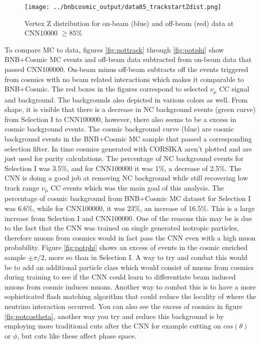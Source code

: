 \begin{figure}[htp!]
\centering
\texttt{[image: ../bnbcosmic\_output/data85\_trackstartZdist.png]}
\caption{Vertex Z distribution for on-beam (blue) and off-beam (red) data at CNN10000 $\geq 85\%$} 
\label{fig:dataZ}
\end{figure}

To compare MC to data, figures \ref{fig:pottrack} through \ref{fig:potphi} show BNB+Cosmic MC events and off-beam data subtracted from on-beam data that passed CNN100000. On-beam minus off-beam subtracts off the events triggered from cosmics with no beam related interactions which makes it comparable to BNB+Cosmic. The red boxes in the figures correspond to selected $\nu_{\mu}$ CC signal and background. The backgrounds also depicted in various colors as well. From shape, it is visible that there is a decrease in NC background events (green curve) from Selection I to CNN100000, however, there also seems to be a excess in cosmic background events. The cosmic background curve (blue) are cosmic background events in the BNB+Cosmic MC sample that passed a corresponding selection filter. In time cosmics generated with CORSIKA aren't plotted and are just used for purity calculations. The percentage of NC background events for Selection I was 3.5\%, and for CNN100000 it was 1\%, a decrease of 2.5\%. The CNN is doing a good job at removing NC background while still recovering low track range $\nu_{\mu}$ CC events which was the main goal of this analysis. The percentage of cosmic background from BNB+Cosmic MC dataset for Selection I was 6.6\%, while for CNN100000, it was 23\%, an increase of 16.5\%. This is a large increase from Selection I and CNN100000. One of the reasons this may be is due to the fact that the CNN was trained on single generated isotropic particles, therefore muons from cosmics would in fact pass the CNN even with a high muon probability. Figure \ref{fig:potphi} shows an excess of events in the cosmic enriched sample $\pm\pi/2$, more so than in Selection I. A way to try and combat this would be to add an additional particle class which would consist of muons from cosmics during training to see if the CNN could learn to differentiate beam induced muons from cosmic induces muons. Another way to combat this is to have a more sophisticated flash matching algorithm that could reduce the locality of where the neutrino interaction occurred. You can also see the excess of cosmics in figure \ref{fig:potcostheta}, another way you try and reduce this background is by employing more traditional cuts after the CNN for example cutting on $cos(\theta)$ or $\phi$, but cuts like these affect phase space. 


